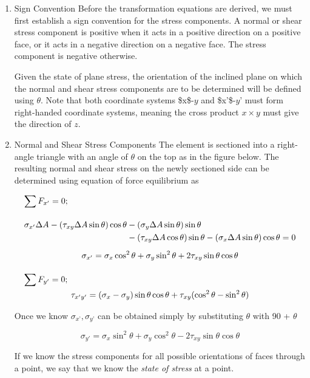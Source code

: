 \documentclass[a4paper,openany,12pt]{book}
\begin{document}
\begin{enumerate}
\item Sign Convention
\label{sign-convention}
Before the transformation equations are derived, we must first establish
a sign convention for the stress components. A normal or shear stress
component is positive when it acts in a positive direction on a positive
face, or it acts in a negative direction on a negative face. The stress
component is negative otherwise.

Given the state of plane stress, the orientation of the inclined plane
on which the normal and shear stress components are to be determined
will be defined using \(\theta\). Note that both coordinate systems
\$x\$-\(y\) and \$x’\$-\(y’\) must form right-handed coordinate systems, meaning
the cross product \(x \times y\) must give the direction of \(z\).


\item Normal and Shear Stress Components
\label{normal-and-shear-stress-components}
The element is sectioned into a right-angle triangle with an angle of
\(\theta\) on the top as in the figure below. The resulting normal and
shear stress on the newly sectioned side can be determined using
equation of force equilibrium as

$$\begin{gathered}
  \sum F_{x'}  = 0; \hfill \\[1em]
  \begin{split}
    \sigma_{x'}\Delta A - (\tau_{xy}\Delta A\sin \theta )\cos \theta  &- (\sigma_y\Delta A\sin \theta )\sin \theta  \\
    &- (\tau_{xy}\Delta A\cos \theta )\sin \theta  - (\sigma_x\Delta A\sin \theta )\cos \theta  = 0
  \end{split} \nonumber \\[0.5em]
  \sigma_{x'} = \sigma_x\cos^2\theta  + \sigma_y\sin^2\theta  + 2\tau_{xy}\sin \theta \cos \theta  \\[1em]
  \sum F_{y'}  = 0; \hfill \\ 
  \tau_{x'y'} = (\sigma_x - \sigma_y)\sin \theta \cos \theta  + \tau_{xy}(\cos^2\theta  - \sin ^2\theta ) \\ 
\end{gathered}$$

Once we know \(\sigma_{x’}, \sigma_{y’}\) can be obtained simply by
substituting \(\theta\) with 90 + \(\theta\)

$$\sigma_{y'} = \sigma_x\sin^2\theta  + \sigma_y\cos^2\theta  - 2\tau_{xy}\sin \theta \cos \theta$$

If we know the stress components for all possible orientations of faces
through a point, we say that we know the \emph{state of stress} at a point.
\end{enumerate}
\end{document}

